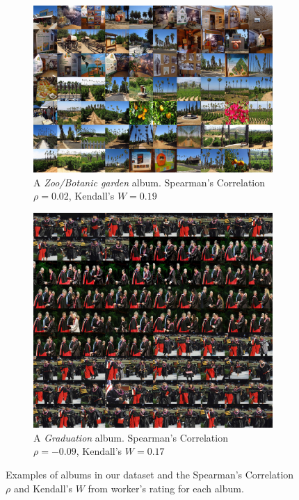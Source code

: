 \documentclass[10pt,twocolumn,letterpaper]{article}
\begin{document}
\begin{figure}[ht]
\\
\begin{subfigure}{0.49\textwidth}
  \includegraphics[width=\linewidth]{zoo_canvas}
  \caption{A \textit{Zoo/Botanic garden} album. Spearman's Correlation $\rho = 0.02$, Kendall's $W = 0.19$}
  \label{fig:sfig3}
\end{subfigure}
\begin{subfigure}{0.49\textwidth}
  \includegraphics[width=\linewidth]{graduation_canvas}
  \caption{A \textit{Graduation} album.  Spearman's Correlation $\rho = -0.09$, Kendall's $W = 0.17$}
  \label{fig:sfig4}
\end{subfigure}
\caption{Examples of albums in our dataset and the Spearman's Correlation $\rho$ and Kendall's $W$ from worker's rating for each album.}
\label{figure2}
\end{figure}
\end{document}
